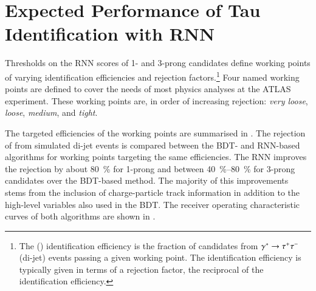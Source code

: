 \section{Expected Performance of Tau Identification with RNN}%
\label{sec:tauid_perf}

Thresholds on the RNN scores of 1- and 3-prong \tauhadvis candidates
define working points of varying \tauhadvis identification
efficiencies and \faketauhadvis rejection factors.\footnote{The
  \truetauhadvis (\faketauhadvis) identification efficiency is the
  fraction of \tauhadvis candidates from $\gammastar \to \tautau$
  (di-jet) events passing a given working point. The \faketauhadvis
  identification efficiency is typically given in terms of a rejection
  factor, the reciprocal of the identification efficiency.} Four named
working points are defined to cover the needs of most physics analyses
at the ATLAS experiment. These working points are, in order of
increasing \faketauhadvis rejection: \emph{very loose}, \emph{loose},
\emph{medium}, and \emph{tight}.

The targeted \truetauhadvis efficiencies of the working points are
summarised in . The rejection of \faketauhadvis from
simulated di-jet events is compared between the BDT- and RNN-based
\tauid algorithms for working points targeting the same \truetauhadvis
efficiencies. The RNN \tauid improves the \faketauhadvis rejection by
about \SI{80}{\percent} for 1-prong and between
\SIrange{40}{80}{\percent} for 3-prong \tauhadvis candidates over the
BDT-based method. The majority of this improvements stems from the
inclusion of charge-particle track information in addition to the
high-level variables also used in the BDT. The receiver operating
characteristic curves of both algorithms are shown in
.

\begin{table}[htbp]
  \centering

  \caption{Summary of working points defined for the BDT and RNN-based
    \tauid. Only the targeted \truetauhadvis efficiency (target
    \truetauhadvis eff.) of the working points is given which can
    deviate by ca.\ \SI{1}{\percent} from the actual efficiency
    observed in simulated $\gammastar \to \tautau$ events. The
    \faketauhadvis rejection is evaluated using the \tauhadvis
    candidate sample from di-jet events. The table is adapted from
    Ref.~\cite{ATL-PHYS-PUB-2019-033}.}%
  \label{tab:rnn_wps}

  
\end{table}

